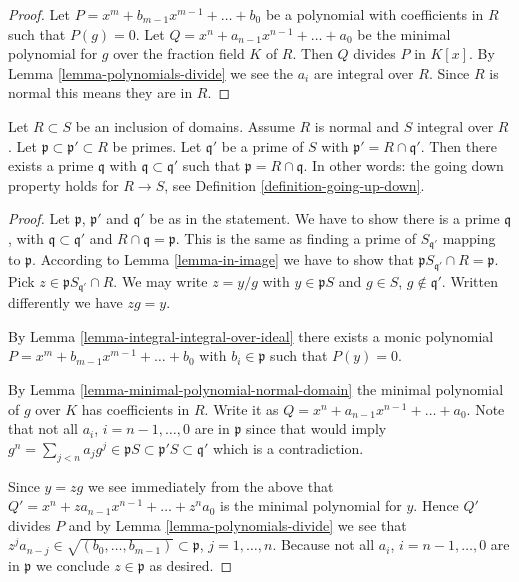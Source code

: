 \begin{proof}
Let $P = x^m + b_{m-1} x^{m-1} + \ldots + b_0$
be a polynomial with coefficients in $R$
such that $P(g) = 0$. Let $Q = x^n + a_{n-1}x^{n-1} + \ldots + a_0$
be the minimal polynomial for $g$ over the fraction field
$K$ of $R$. Then $Q$ divides $P$ in $K[x]$. By Lemma
\ref{lemma-polynomials-divide} we see the $a_i$ are
integral over $R$. Since $R$ is normal this
means they are in $R$.
\end{proof}

\begin{proposition}
\label{proposition-going-down-normal-integral}
Let $R \subset S$ be an inclusion of domains.
Assume $R$ is normal and $S$ integral over $R$.
Let $\mathfrak p \subset \mathfrak p' \subset R$
be primes. Let $\mathfrak q'$ be a prime of $S$
with $\mathfrak p' = R \cap \mathfrak q'$.
Then there exists a prime $\mathfrak q$
with $\mathfrak q \subset \mathfrak q'$
such that $\mathfrak p = R \cap \mathfrak q$. In other words:
the going down property holds for $R \to S$, see
Definition \ref{definition-going-up-down}.
\end{proposition}

\begin{proof}
Let $\mathfrak p$, $\mathfrak p'$ and $\mathfrak q'$
be as in the statement. We have to show there is a prime
$\mathfrak q$, with $\mathfrak q \subset \mathfrak q'$ and
$R \cap \mathfrak q = \mathfrak p$. This is the same
as finding a prime of
$S_{\mathfrak q'}$ mapping to $\mathfrak p$.
According to Lemma \ref{lemma-in-image} we have to show
that $\mathfrak p S_{\mathfrak q'} \cap R
= \mathfrak p$. Pick $z \in \mathfrak p S_{\mathfrak q'} \cap R$.
We may write $z = y/g$ with $y \in \mathfrak pS$ and
$g \in S$, $g \not\in \mathfrak q'$. Written
differently we have $zg = y$.

\medskip\noindent
By Lemma \ref{lemma-integral-integral-over-ideal}
there exists a monic polynomial
$P = x^m + b_{m-1} x^{m-1} + \ldots + b_0$
with $b_i \in \mathfrak p$ such that $P(y) = 0$.

\medskip\noindent
By Lemma \ref{lemma-minimal-polynomial-normal-domain}
the minimal polynomial of $g$ over $K$ has coefficients
in $R$. Write it as $Q = x^n + a_{n-1} x^{n-1} + \ldots
+ a_0$. Note that not all $a_i$, $i = n-1, \ldots, 0$
are in $\mathfrak p$ since that would imply
$g^n = \sum_{j < n} a_j g^j \in \mathfrak pS
\subset \mathfrak p'S
\subset \mathfrak q'$
which is a contradiction.

\medskip\noindent
Since $y = zg$ we see immediately from the above
that $Q' = x^n + za_{n-1} x^{n-1} + \ldots + z^{n}a_0$
is the minimal polynomial for $y$. Hence
$Q'$ divides $P$ and by Lemma \ref{lemma-polynomials-divide}
we see that $z^ja_{n - j} \in \sqrt{(b_0, \ldots, b_{m-1})}
\subset \mathfrak p$, $j =  1, \ldots, n$.
Because not all $a_i$, $i = n-1, \ldots, 0$
are in $\mathfrak p$ we conclude $z \in \mathfrak p$
as desired.
\end{proof}














